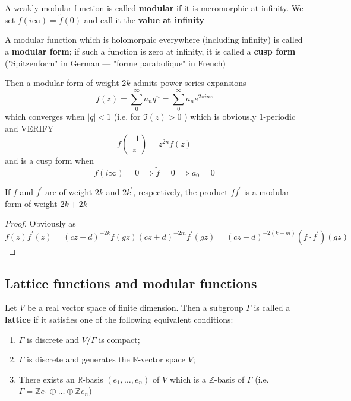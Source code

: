 \documentclass[12pt]{article}
\theoremstyle{definition}
\begin{document}
\begin{dfn}
A weakly modular function is called \textbf{modular} if it is meromorphic at infinity. We set \(f(i\infty )= \widetilde{f}(0) \) and call it the \textbf{value at infinity}  
\end{dfn}
\begin{dfn}
A modular function which is holomorphic everywhere (including infinity) is called a \textbf{modular form}; if such a function is zero at infinity, it is called a \textbf{cusp form} ("Spitzenform" in German --- "forme parabolique" in French)  
\end{dfn}
Then a modular form of weight \(2k\) admits power series expansions
\[
    f(z) = \sum_{0}^{\infty} a_n q^n = \sum_{0}^{\infty} a_n e^{2\pi i n z}
\]
which converges when \(\vert q \vert <1\) (i.e. for \(\Im (z)>0\) ) which is obviously \(1\)-periodic and VERIFY
\[
    f\left(\frac{-1}{z}\right) = z^{2n}f(z)
\]
and is a cusp form when \[f(i \infty ) = 0 \implies \widetilde{f} = 0 \implies a_{0}=0 \]

\begin{claim}
    If \(f\) and \(f^{\prime} \) are of weight \(2k\) and \(2k^{\prime} \), respectively, the product \(f f^{\prime} \) is a modular form of weight \(2k+2k^{\prime} \)     
\end{claim}
\begin{proof}
    Obviously as
    \[
        f(z)f^{\prime}(z) = (cz+d)^{-2k} f(gz) (cz+d)^{-2m} f^{\prime} (gz) = (cz+d)^{-2(k+m)} (f\cdot f^{\prime} )(gz)
    \]
\end{proof}

\subsection{Lattice functions and modular functions}

\begin{dfn}
Let \(V\) be a real vector space of finite dimension. Then a subgroup \(\Gamma \) is called a \textbf{lattice} if it satisfies one of the following equivalent conditions:
\begin{enumerate}[label=(\alph*)]
    \item \(\Gamma \) is discrete and \(V/\Gamma \) is compact;
    \item \(\Gamma \) is discrete and generates the \(\mathbb{R} \)-vector space \(V\);
    \item There exists an \(\mathbb{R} \)-basis \((e_1,\dots,e_n)\) of \(V\) which is a \(\mathbb{Z} \)-basis of \(\Gamma \) (i.e. \(\Gamma = \mathbb{Z} e_1 \oplus  \dots \oplus \mathbb{Z} e_n\))        
\end{enumerate}   
\end{dfn}
\end{document}
